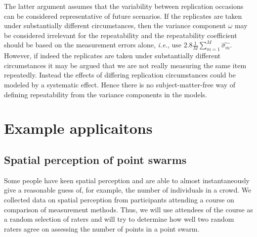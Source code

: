 \documentclass[aoas]{imsart}
\makeatletter
\newcommand{\ie}{\emph{i.e.}\@\xspace}
\makeatother
\begin{document}
The latter argument assumes that the variability between replication
occasions can be considered representative of future scenarios.  If
the replicates are taken under substantially different circumstances,
then the variance component $\omega$ may be considered irrelevant for
the repeatability and the repeatability coefficient should be based on
the measurement errors alone, \ie, use
$2.8\frac{1}{M}\sum_{m=1}^M\widehat{\sigma_m}$.  However, if indeed the
replicates are taken under substantially different circumstances it
may be argued that we are not really measuring the same item
repeatedly. Instead the effects of differing replication circumstances
could be modeled by a systematic effect. Hence there is no
subject-matter-free way of defining repeatability from the variance
components in the models.



\section{Example applicaitons}
\label{sec:example}


\subsection{Spatial perception of point swarms}

Some people have keen spatial perception and are able to almost
instantaneous\-ly give a reasonable guess of, for example, the number of
individuals in a crowd. We collected data on spatial perception from
participants attending a course on comparison of measurement
methods. Thus, we will use attendees of the course as a random
selection of raters and will try to determine how well two random
raters agree on assessing the number of points in a point swarm.
\end{document}
